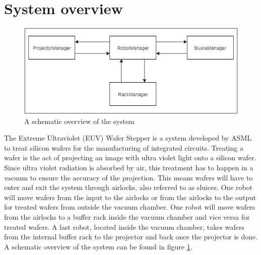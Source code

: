\documentclass[12pt]{report}
\begin{document}
	\section{System overview}
	\begin{figure}
		\centering
		\includegraphics[scale=0.7]{schematicoverview}
		\caption{A schematic overview of the system}
		\label{fig:overview}
	\end{figure}
	The Extreme Ultraviolet (EUV) Wafer Stepper is a system developed by ASML to treat silicon wafers for the manufacturing of integrated circuits. Treating a wafer is the act of projecting an image with ultra violet light onto a silicon wafer. Since ultra violet radiation is absorbed by air, this treatment has to happen in a vacuum to ensure the accuracy of the projection. This means wafers will have to enter and exit the system through airlocks, also referred to as sluices. One robot will move wafers from the input to the airlocks or from the airlocks to the output for treated wafers from outside the vacuum chamber. One robot will move wafers from the airlocks to a buffer rack inside the vacuum chamber and vice versa for treated wafers. A last robot, located inside the vacuum chamber, takes wafers from the internal buffer rack to the projector and back once the projector is done. A schematic overview of the system can be found in figure \ref{fig:overview}.
\end{document}
